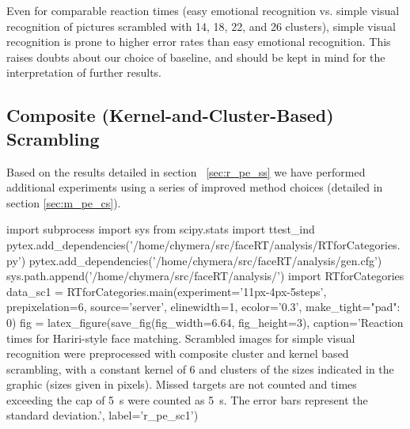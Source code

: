 	    Even for comparable reaction times (easy emotional recognition vs. simple visual recognition of pictures scrambled with \SI{14}{\pixel}, \SI{18}{\pixel}, \SI{22}{\pixel}, and \SI{26}{\pixel} clusters), simple visual recognition is prone to higher error rates than easy emotional recognition.
	    This raises doubts about our choice of baseline, and should be kept in mind for the interpretation of further results.
	\subsection{Composite (Kernel-and-Cluster-Based) Scrambling}\label{sec:r_pe_cs}
	    Based on the results detailed in section ~\ref{sec:r_pe_ss} we have performed additional experiments using a series of improved method choices (detailed in section \ref{sec:m_pe_cs}).
	    \begin{pycode}
		import subprocess
		import sys
		from scipy.stats import ttest_ind
		pytex.add_dependencies('/home/chymera/src/faceRT/analysis/RTforCategories.py')
		pytex.add_dependencies('/home/chymera/src/faceRT/analysis/gen.cfg')
		sys.path.append('/home/chymera/src/faceRT/analysis/')
		import RTforCategories
		data_sc1 = RTforCategories.main(experiment='11px-4px-5steps', prepixelation=6, source='server', elinewidth=1, ecolor='0.3', make_tight={"pad": 0})
		fig = latex_figure(save_fig(fig_width=6.64, fig_height=3), caption='Reaction times for Hariri-style face matching. Scrambled images for simple visual recognition were preprocessed with composite cluster and kernel based scrambling, with a constant kernel of \SI{6}{\pixel} and clusters of the sizes indicated in the graphic (sizes given in pixels). Missed targets are not counted and times exceeding the cap of \SI{5}{\second} were counted as \SI{5}{\second}. The error bars represent the standard deviation.', label='r_pe_sc1')
	    \end{pycode}
	    
